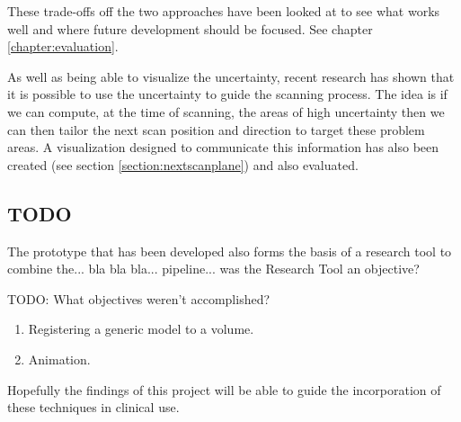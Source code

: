 These trade-offs off the two approaches have been looked at to see what works well and where future development should be focused. See chapter \ref{chapter:evaluation}.

As well as being able to visualize the uncertainty, recent research\cite{uncertaintysvd} has shown that it is possible to use the uncertainty to guide the scanning process. The idea is if we can compute, at the time of scanning, the areas of high uncertainty then we can then tailor the next scan position and direction to target these problem areas. A visualization designed to communicate this information has also been created (see section \ref{section:nextscanplane}) and also evaluated.

\subsection{TODO}
The prototype that has been developed also forms the basis of a research tool to combine the... bla bla bla... pipeline... was the Research Tool an objective?

TODO: What objectives weren't accomplished?
\begin{enumerate}
	\item Registering a generic model to a volume.
	\item Animation.	
\end{enumerate}

Hopefully the findings of this project will be able to guide the incorporation of these techniques in clinical use.

